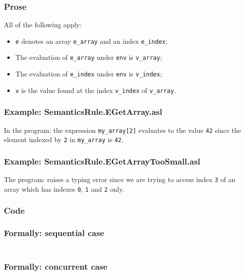 \documentclass{book}
\begin{document}
  \subsubsection{Prose}
  All of the following apply:
  \begin{itemize}
  \item \texttt{e} denotes an array \texttt{e\_array} and an index \texttt{e\_index};
  \item The evaluation of \texttt{e\_array} under \texttt{env} is \texttt{v\_array};
  \item The evaluation of \texttt{e\_index} under \texttt{env} is \texttt{v\_index};
  \item \texttt{v} is the value found at the index \texttt{v\_index} of \texttt{v\_array}.
  \end{itemize}

  \subsubsection{Example: SemanticsRule.EGetArray.asl}
    In the program:
    the expression \texttt{my\_array[2]} evaluates to the value \texttt{42} since the element
    indexed by \texttt{2} in \texttt{my\_array} is \texttt{42}.

  \subsubsection{Example: SemanticsRule.EGetArrayTooSmall.asl}
    The program:
    raises a typing error since we are trying to access index \texttt{3} of an array
    which has indexes \texttt{0}, \texttt{1} and \texttt{2} only.

  \subsubsection{Code}

  \subsubsection{Formally: sequential case}
  \begin{align}
  \end{align} 

  \subsubsection{Formally: concurrent case}
  \begin{align}
  \end{align} 
\end{document}
